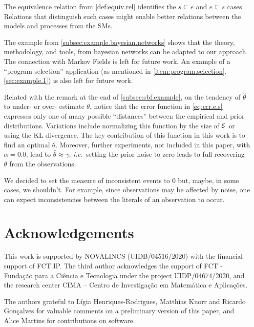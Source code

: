 \documentclass[adraft,copyright,creativecommons]{eptcs}
\newcommand{\fml}[1]{\ensuremath{{\cal #1}}}
\newcounter{remark}
\begin{document}
The equivalence relation from \cref{def:equiv.rel} identifies the $s \subseteq e$ and $e \subseteq s$ cases. Relations that distinguish such cases might enable better relations between the models and processes from the \aclp{SM}.

The example from \cref{subsec:example.bayesian.networks} shows that the theory, methodology, and tools, from bayesian networks can be adapted to our approach. The connection with Markov Fields \cite{kindermann80} is left for future work. An example of a ``program selection'' application (as mentioned in \cref{item:program.selection}, \cref{sec:example.1}) is also left for future work.

Related with the remark at the end of \cref{subsec:sbf.example}, on the tendency of $\hat{\theta}$ to under- or over- estimate $\theta$, notice that the error function in \eqref{eq:err.e.s} expresses only one of many possible ``distances'' between the empirical and prior distributions. Variations include normalizing this function by the size of $\fml{E}$ or using the \acl{KL} divergence. The key contribution of this function in this work is to find an optimal $\theta$. Moreover, further experiments, not included in this paper, with $\alpha = 0.0$, lead to $\hat{\theta} \approx \gamma$, \emph{i.e.}\ setting the prior noise to zero leads to full recovering $\theta$ from the observations.

We decided to set the measure of inconsistent events to $0$ but, maybe, in some cases, we shouldn't. For example, since observations may be affected by noise, one can expect inconsistencies between the literals of an observation to occur.
%
%
%
\section*{Acknowledgements}
%
%
%
This work is supported by NOVALINCS (UIDB/04516/2020) with the financial support of FCT.IP.
The third author acknowledges the support of FCT - Funda\c{c}\~ao para a Ci\^{e}ncia e Tecnologia under the project UIDP/04674/2020, and the research center CIMA -- Centro de Investigação em Matemática e Aplicações.

The authors grateful to Lígia Henriques-Rodrigues, Matthias Knorr and Ricardo Gonçalves for valuable comments on a preliminary version of this paper, and Alice Martins for contributions on software.
%
%
\nocite{*}


\end{document}
